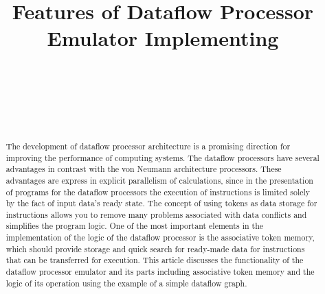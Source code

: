 \documentclass[
11pt,%
tightenlines,%
twoside,%
onecolumn,%
nofloats,%
nobibnotes,%
nofootinbib,%
superscriptaddress,%
noshowpacs,%
centertags]%
{revtex4}
\begin{document}

\title{Features of Dataflow Processor Emulator Implementing}

\author{~}

\author{~}

\author{~}



\begin{abstract}
The development of dataflow processor architecture is a promising
direction for improving the performance of computing systems. The
dataflow processors have several advantages in contrast with the von
Neumann architecture processors. These advantages are express in
explicit parallelism of calculations, since in the presentation of
programs for the dataflow processors the execution of instructions
is limited solely by the fact of input data's ready state. The
concept of using tokens as data storage for instructions allows you
to remove many problems associated with data conflicts and
simplifies the program logic. One of the most important elements in
the implementation of the logic of the dataflow processor is the
associative token memory, which should provide storage and quick
search for ready-made data for instructions that can be transferred
for execution. This article discusses the functionality of the
dataflow processor emulator and its parts including associative
token memory and the logic of its operation using the example of a
simple dataflow graph.
\end{abstract}
\end{document}

